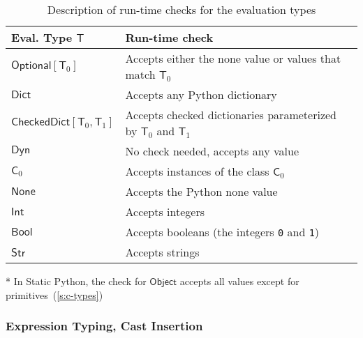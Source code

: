 \documentclass[english,cleveref,submission]{programming}
\newcommand{\SP}{Static Python}
\newcommand{\code}[1]{\texttt{#1}}
\newcommand{\typefont}[1]{\mathsf{#1}}
\newcommand{\paramtype}[2]{#1[#2]}
\newcommand{\spteval}{\typefont{T}}
\newcommand{\sptclass}{\typefont{C}}
\newcommand{\sptint}{\typefont{Int}}
\newcommand{\sptstr}{\typefont{Str}}
\newcommand{\sptbool}{\typefont{Bool}}
\newcommand{\sptdyn}{\typefont{Dyn}}
\newcommand{\sptobject}{\typefont{Object}}
\newcommand{\sptnone}{\typefont{None}}
\newcommand{\sptoptional}[1]{\paramtype{\typefont{Optional}}{#1}}
\newcommand{\sptrawpydict}{\typefont{Dict}}
\newcommand{\sptrawchkdict}{\typefont{CheckedDict}} %
\newcommand{\sptchkdict}[2]{\paramtype{\sptrawchkdict}{#1, #2}}
\begin{document}
\begin{table}[t]
  \begin{threeparttable}
  \centering
  \caption{Description of run-time checks for the evaluation types}
  \label{t:cast}

    \begin{tabular}{l@{\quad}l}
    {Eval. Type $\spteval$} & {Run-time check} \\\hline
    $\sptoptional{\spteval_0}$ & {Accepts either the none value or values that match $\spteval_0$} \\
    $\sptrawpydict$ & {Accepts any Python dictionary} \\
    $\sptchkdict{\spteval_0}{\spteval_1}$ & {Accepts checked dictionaries parameterized by $\spteval_0$ and $\spteval_1$} \\
    $\sptdyn$ & {No check needed, accepts any value} \\
    $\sptclass_0$ & {Accepts instances of the class $\sptclass_0$\tnote{*}} \\
    $\sptnone$ & {Accepts the Python none value} \\
    $\sptint$ & {Accepts integers} \\
    $\sptbool$ & {Accepts booleans (the integers \code{0} and \code{1})} \\
    $\sptstr$ & {Accepts strings}
    \end{tabular}

    \begin{tablenotes}
    \item {*} {\footnotesize In \SP{}, the check for $\sptobject$ accepts all values except for primitives~(\cref{s:c-types})}
    \end{tablenotes}
\end{threeparttable}
\end{table}


\subsubsection{Expression Typing, Cast Insertion}
\end{document}
